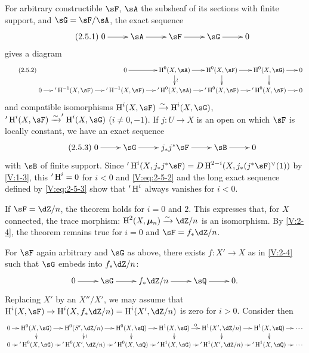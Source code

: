 For arbitrary constructible $\sF$, $\sA$ the subsheaf of its sections with
finite support, and $\sG=\sF/\sA$, the exact sequence
\begin{equation*}\label{V:eq:2-5-1}\tag{2.5.1}
\xymatrix{
  0 \ar[r]
    & \sA \ar[r]
    & \sF \ar[r]
    & \sG \ar[r]
    & 0
}
\end{equation*}
gives a diagram
\begin{equation*}\tag{2.5.2}\label{V:eq:2-5-2}
\xymatrix@=.5cm{
  & & 0 \ar[r]
    & \h^0(X,\sA) \ar[r] \ar[d]^-\wr
    & \h^0(X,\sF) \ar[r] \ar[d]
    & \h^0(X,\sG) \ar[r] \ar[d]
    & 0 \\
  0 \ar[r]
  & '\h^{-1}(X,\sF) \ar[r]
  & '\h^{-1}(X,\sF) \ar[r]
  & '\h^0(X,\sA) \ar[r]
  & '\h^0(X,\sF) \ar[r]
  & '\h^0(X,\sF) \ar[r]
  & 0
}
\end{equation*}
and compatible isomorphisms $\h^i(X,\sF)\iso \h^i(X,\sG)$,
$'\h^i(X,\sF) \iso '\h^i(X,\sG)$ ($i\ne 0,-1$). If $j:U\to X$ is an open on
which $\sF$ is locally constant, we have an exact sequence
\begin{equation*}\tag{2.5.3}\label{V:eq:2-5-3}
\xymatrix{
  0 \ar[r]
    & \sG \ar[r]
    & j_\ast j^\ast \sF \ar[r]
    & \sB \ar[r]
    & 0
}
\end{equation*}
with $\sB$ of finite support. Since
$'\h^i(X,j_\ast j^\ast\sF) = D \h^{2-i} (X,j_\ast(j^\ast\sF)^\vee(1))$
by \ref{V:1-3}, this $'\operatorname{H}^i=0$ for $i<0$ and \eqref{V:eq:2-5-2} and the
long exact sequence defined by \eqref{V:eq:2-5-3} show that $'\operatorname{H}^i$ always
vanishes for $i<0$.

If $\sF=\dZ/n$, the theorem holds for $i=0$ and $2$. This expresses that,
for $X$ connected, the trace morphism: $\h^2(X,\dmu_n) \iso \dZ/n$ is an
isomorphism. By \ref{V:2-4}, the theorem remains true for $i=0$ and
$\sF=f_\ast\dZ/n$.

For $\sF$ again arbitrary and $\sG$ as above, there exists
$f:X'\to X$ as in \ref{V:2-4} such that $\sG$ embeds into $f_\ast\dZ/n$:
\[\xymatrix{
  0 \ar[r]
    & \sG \ar[r]
    & f_\ast\dZ/n \ar[r]
    & \sQ \ar[r]
    & 0 \text{.}
}\]
Replacing $X'$ by an $X''/X'$, we may assume that
$\h^i(X,\sF) \to \h^i(X,f_\ast\dZ/n) = \h^i(X',\dZ/n)$ is zero for $i>0$.
Consider then
\small
\[\xymatrix@=.3cm{
  0 \ar[r]
    & \h^0(X,\sG) \ar[r] \ar[d]
    & \h^0(S',\dZ/n) \ar[r] \ar[d]^-\wr
    & \h^0(X,\sQ) \ar[r] \ar[d]
    & \h^1(X,\sG) \ar[r]^-0 \ar[d]
    & \h^1(X',\dZ/n) \ar[r] \ar[d]
    & \h^1(X,\sQ) \ar[r] \ar[d]
    & \cdots \\
  0 \ar[r]
    & '\h^0(X,\sG) \ar[r]
    & '\h^0(X',\dZ/n) \ar[r]
    & '\h^0(X,\sQ) \ar[r]
    & '\h^1(X,\sG) \ar[r]
    & '\h^1(X',\dZ/n) \ar[r]
    & '\h^1(X,\sQ) \ar[r]
    & \cdots
}\]
\normalsize

